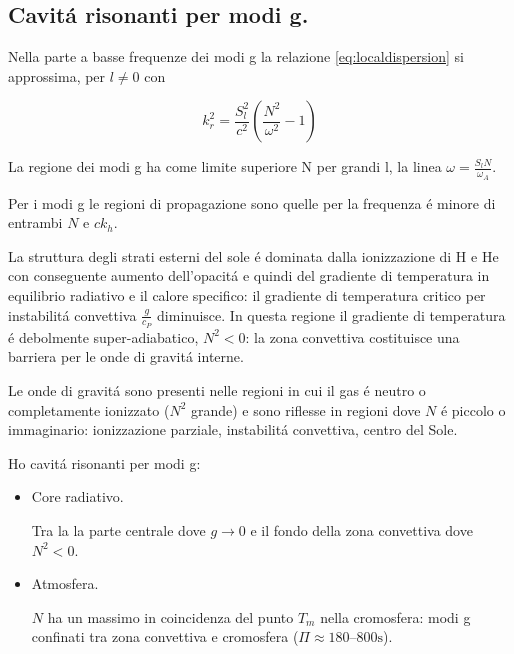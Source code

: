 \begin{comment}
\begin{figure}[!ht]
\centering
\texttt{[image: Duvall]}
\caption{Legge di Duvall.}
\end{figure}
\end{comment}

\clearpage

\subsection{Cavit\'a risonanti per modi g.}

Nella parte a basse frequenze dei modi g la relazione \ref{eq:localdispersion} si approssima, per $l\neq0$ con

\begin{equation*}
k_r^2=\frac{S_l^2}{c^2}(\frac{N^2}{\omega^2}-1)
\end{equation*}

La regione dei modi g ha come limite superiore N per grandi l, la linea $\omega=\frac{S_lN}{\omega_A}$.

Per i modi g le regioni di propagazione sono quelle per la frequenza \'e minore di entrambi $N$ e $ck_h$.

La struttura degli strati esterni del sole \'e dominata dalla ionizzazione di H e He con conseguente aumento dell'opacit\'a e quindi del gradiente di temperatura in equilibrio radiativo e il calore specifico: il gradiente di temperatura critico per instabilit\'a convettiva $\frac{g}{c_P}$ diminuisce. In questa regione il gradiente di temperatura \'e debolmente super-adiabatico, $N^2<0$: la zona convettiva costituisce una barriera per le onde di gravit\'a interne.

Le onde di gravit\'a sono presenti nelle regioni in cui il gas \'e neutro o completamente ionizzato ($N^2$ grande) e sono riflesse in regioni dove $N$ \'e piccolo o immaginario: ionizzazione parziale, instabilit\'a convettiva, centro del Sole.

Ho cavit\'a risonanti per modi g:
\begin{itemize}
    \item Core radiativo.
    
    Tra la la parte centrale dove $g\to0$ e il fondo della zona convettiva dove $N^2<0$.
    \item Atmosfera.
    
    $N$ ha un massimo in coincidenza del punto $T_m$ nella cromosfera: modi g confinati tra zona convettiva e cromosfera ($\Pi\approx\numrange{180}{800}\si{\second}$).
\end{itemize}


